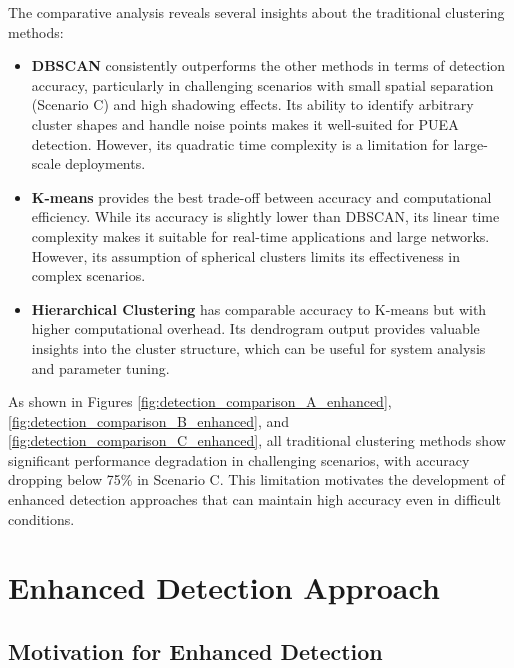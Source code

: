 The comparative analysis reveals several insights about the traditional clustering methods:

\begin{tcolorbox}[enhanced, colback=yellow!5, colframe=yellow!75!black, title=Key Findings from Traditional Methods, sharp corners]
\begin{itemize}
    \item \textbf{DBSCAN} consistently outperforms the other methods in terms of detection accuracy, particularly in challenging scenarios with small spatial separation (Scenario C) and high shadowing effects. Its ability to identify arbitrary cluster shapes and handle noise points makes it well-suited for PUEA detection. However, its quadratic time complexity is a limitation for large-scale deployments.
    
    \item \textbf{K-means} provides the best trade-off between accuracy and computational efficiency. While its accuracy is slightly lower than DBSCAN, its linear time complexity makes it suitable for real-time applications and large networks. However, its assumption of spherical clusters limits its effectiveness in complex scenarios.
    
    \item \textbf{Hierarchical Clustering} has comparable accuracy to K-means but with higher computational overhead. Its dendrogram output provides valuable insights into the cluster structure, which can be useful for system analysis and parameter tuning.
\end{itemize}
\end{tcolorbox}

As shown in Figures \ref{fig:detection_comparison_A_enhanced}, \ref{fig:detection_comparison_B_enhanced}, and \ref{fig:detection_comparison_C_enhanced}, all traditional clustering methods show significant performance degradation in challenging scenarios, with accuracy dropping below 75\% in Scenario C. This limitation motivates the development of enhanced detection approaches that can maintain high accuracy even in difficult conditions.

\chapter{Enhanced Detection Approach}

\section{Motivation for Enhanced Detection}

